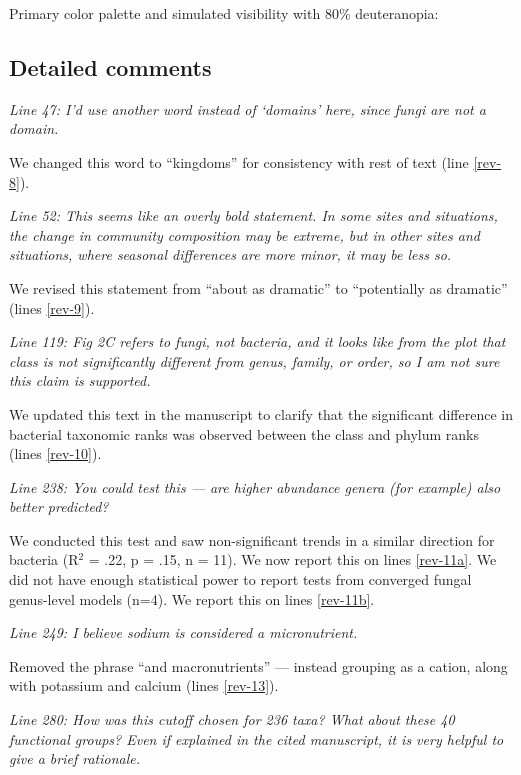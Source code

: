 \documentclass[11pt]{article}
\begin{document}
Primary color palette and simulated visibility with 80\% deuteranopia:

\subsection*{Detailed comments}

\textit{Line 47: I'd use another word instead of `domains' here, since fungi are not a domain.}

We changed this word to ``kingdoms'' for consistency with rest of text (line \ref{rev-8}).

\bigskip

\textit{Line 52: This seems like an overly bold statement. In some sites and situations, the change in community composition may be extreme, but in other sites and situations, where seasonal differences are more minor, it may be less so.}

We revised this statement from ``about as dramatic'' to ``potentially as dramatic'' (lines \ref{rev-9}).

\bigskip

\textit{Line 119: Fig 2C refers to fungi, not bacteria, and it looks like from the plot that class is not significantly different from genus, family, or order, so I am not sure this claim is supported.}

We updated this text in the manuscript to clarify that the significant difference in bacterial taxonomic ranks was observed between the class and phylum ranks (lines \ref{rev-10}).

\bigskip

\textit{Line 238: You could test this --- are higher abundance genera (for example) also better predicted?}

We conducted this test and saw non-significant trends in a similar direction for bacteria (R$^2$ = .22, p = .15, n = 11). We now report this on lines \ref{rev-11a}. We did not have enough statistical power to report tests from converged fungal genus-level models (n=4). We report this on lines \ref{rev-11b}.

\bigskip

\textit{Line 249: I believe sodium is considered a micronutrient.}

Removed the phrase ``and macronutrients'' --- instead grouping as a cation, along with potassium and calcium (lines \ref{rev-13}).

\bigskip

\textit{Line 280: How was this cutoff chosen for 236 taxa? What about these 40 functional groups? Even if explained in the cited manuscript, it is very helpful to give a brief rationale.}
\end{document}
